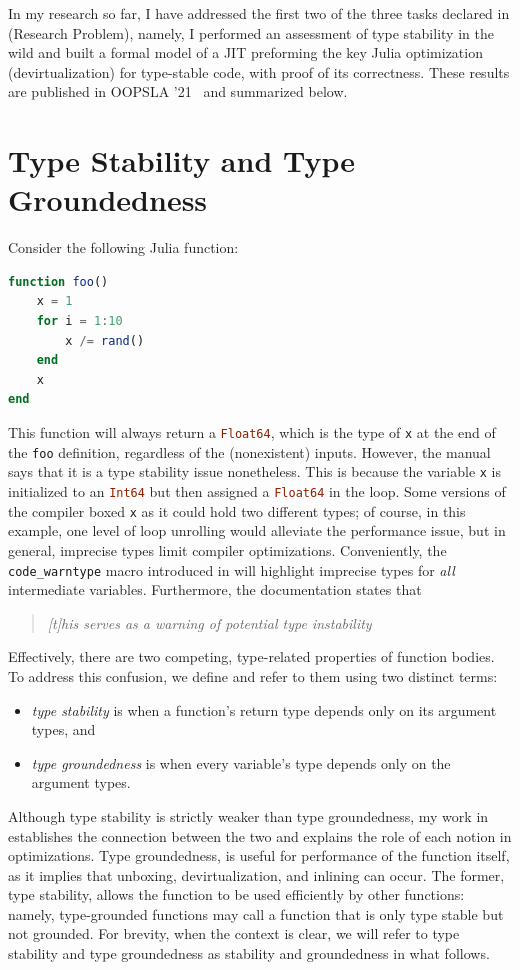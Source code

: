 \documentclass[oneside,openright,titlepage,numbers=noenddot,%
headinclude,footinclude,cleardoublepage=empty,abstract=on,
BCOR=5mm,paper=a4,fontsize=11pt,
dvipsnames
]{scrreprt}
\renewcommand{\c}[1]{\lstinline[language=Julia]!#1!\xspace}
\newenvironment{itquote}{\begin{quote}\itshape}{\end{quote}\ignorespacesafterend}
\begin{document}
In my research so far, I have addressed the first two of the three tasks
declared in  (Research Problem), namely, I performed an
assessment of type stability in the wild and built a formal model of a JIT
preforming the key Julia optimization (devirtualization) for type-stable code,
with proof of its correctness. These results are published in OOPSLA
'21~\cite{Pelenitsyn21} and summarized below.


\section{Type Stability and Type Groundedness}%
\label{sec:ts-tg}

Consider the following Julia function:
\begin{lstlisting}[language=julia]
function foo()
    x = 1
    for i = 1:10
        x /= rand()
    end
    x
end
\end{lstlisting}
This function will always return a \c{Float64}, which is the type of \c{x} at
the end of the \c{foo} definition, regardless of the (nonexistent) inputs.
However, the manual says that it is a type stability issue nonetheless. This is
because the variable \c{x} is initialized to an \c{Int64} but then assigned a
\c{Float64} in the loop. Some versions of the compiler boxed \c{x} as it could
hold two different types; of course, in this example, one level of loop
unrolling would alleviate the performance issue, but in general, imprecise types
limit compiler optimizations. Conveniently, the \c{code_warntype} macro
introduced in  will highlight imprecise types for
\emph{all} intermediate variables. Furthermore, the documentation states that
\begin{itquote}
  [t]his serves as a warning of potential type instability
\end{itquote}

Effectively, there are two competing, type-related properties of function
bodies. To address this confusion, we define and refer to them using two
distinct terms:
\begin{itemize}
  \item \emph{type stability} is when a function's return type depends only on
    its argument types, and
  \item \emph{type groundedness} is when every variable's type depends
    only on the argument types.
\end{itemize}
Although type stability is strictly weaker than type groundedness,
my work in~\cite{Pelenitsyn21} establishes the connection between the two and
explains the role of each notion in optimizations. Type
groundedness, is useful for performance of the function itself, as it implies
that unboxing, devirtualization, and inlining can occur. The former, type
stability, allows the function to be used efficiently by other functions:
namely, type-grounded functions may call a function that is only type stable but
not grounded. For brevity, when the context is clear, we will refer to type
stability and type groundedness as stability and groundedness in what follows.
\end{document}
